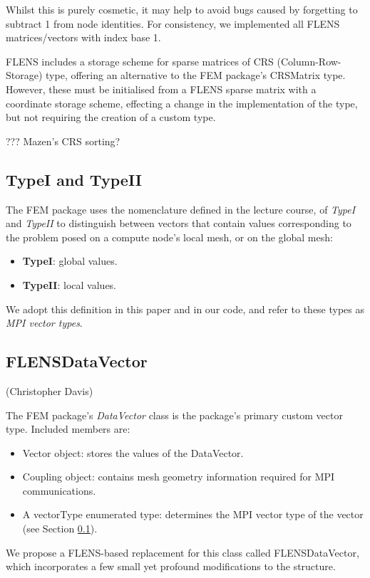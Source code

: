 Whilst this is purely cosmetic, it may help to avoid bugs caused by forgetting to subtract 1 from node identities. For consistency, we implemented all FLENS matrices/vectors with index base 1.

FLENS includes a storage scheme for sparse matrices of CRS (Column-Row-Storage) type, offering an alternative to the FEM package's CRSMatrix type. However, these must be initialised from a FLENS sparse matrix with a coordinate storage scheme, effecting a change in the implementation of the type, but not requiring the creation of a custom type.

??? Mazen's CRS sorting?

\subsection{TypeI and TypeII}\label{subsc:typeI_II}

The FEM package uses the nomenclature defined in the lecture course, of \emph{TypeI} and \emph{TypeII} to distinguish between vectors that contain values corresponding to the problem posed on a compute node's local mesh, or on the global mesh:

\begin {itemize}
   \item \textbf{TypeI}: global values.
   \item \textbf{TypeII}: local values.
\end{itemize}

We adopt this definition in this paper and in our code, and refer to these types as \emph{MPI vector types}.

\subsection{FLENSDataVector} (Christopher Davis)

The FEM package's \emph{DataVector} class is the package's primary custom vector type. Included members are:
\begin{itemize}
   \item Vector object: stores the values of the DataVector.
   \item Coupling object: contains mesh geometry information required for MPI communications.
   \item A vectorType enumerated type: determines the MPI vector type of the vector (see Section \ref{subsc:typeI_II}).
\end{itemize}

We propose a FLENS-based replacement for this class called FLENSDataVector, which incorporates a few small yet profound modifications to the structure.

